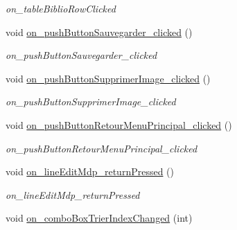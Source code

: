 \begin{DoxyCompactItemize}
\begin{DoxyCompactList}\small\item\em on\+\_\+table\+Biblio\+Row\+Clicked \end{DoxyCompactList}\item 
\mbox{\label{classMainWindow_a93279e87f7a6aa808619892c0c5f2f4a}} 
void \hyperlink{classMainWindow_a93279e87f7a6aa808619892c0c5f2f4a}{on\+\_\+push\+Button\+Sauvegarder\+\_\+clicked} ()
\begin{DoxyCompactList}\small\item\em on\+\_\+push\+Button\+Sauvegarder\+\_\+clicked \end{DoxyCompactList}\item 
\mbox{\label{classMainWindow_ab4183704bae96b91f47d6f186612d4f9}} 
void \hyperlink{classMainWindow_ab4183704bae96b91f47d6f186612d4f9}{on\+\_\+push\+Button\+Supprimer\+Image\+\_\+clicked} ()
\begin{DoxyCompactList}\small\item\em on\+\_\+push\+Button\+Supprimer\+Image\+\_\+clicked \end{DoxyCompactList}\item 
\mbox{\label{classMainWindow_a2ec76fe0831835fa115ccfca42297af6}} 
void \hyperlink{classMainWindow_a2ec76fe0831835fa115ccfca42297af6}{on\+\_\+push\+Button\+Retour\+Menu\+Principal\+\_\+clicked} ()
\begin{DoxyCompactList}\small\item\em on\+\_\+push\+Button\+Retour\+Menu\+Principal\+\_\+clicked \end{DoxyCompactList}\item 
\mbox{\label{classMainWindow_a495b1763c99152a0a067d9efcd5867b6}} 
void \hyperlink{classMainWindow_a495b1763c99152a0a067d9efcd5867b6}{on\+\_\+line\+Edit\+Mdp\+\_\+return\+Pressed} ()
\begin{DoxyCompactList}\small\item\em on\+\_\+line\+Edit\+Mdp\+\_\+return\+Pressed \end{DoxyCompactList}\item 
\mbox{\label{classMainWindow_ab6cdf8f1b4ab60072dc0ba1940e3544d}} 
void \hyperlink{classMainWindow_ab6cdf8f1b4ab60072dc0ba1940e3544d}{on\+\_\+combo\+Box\+Trier\+Index\+Changed} (int)

\end{DoxyCompactItemize}
